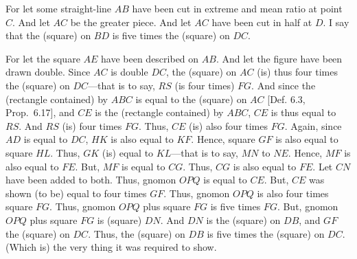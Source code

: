 \begin{Parallel}{}{}
{\epsfysize=2.5in
\centerline{}

For let some straight-line $AB$ have been cut in extreme and mean ratio
at point $C$. And let $AC$ be the greater piece. And let $AC$ have been
cut in half at $D$. I say that the (square) on $BD$ is five times the
(square) on $DC$. 

For let the square $AE$ have been described on $AB$. And let the
figure have been drawn double. Since $AC$ is double $DC$, the
(square) on $AC$ (is) thus four times the (square) on $DC$---that
is to say, $RS$ (is four times) $FG$. And since the (rectangle contained)
by $ABC$ is equal to the (square) on $AC$ [Def. 6.3, Prop.~6.17],
and $CE$ is the (rectangle contained) by $ABC$,  $CE$ is thus equal
to $RS$. And $RS$ (is) four times $FG$. Thus, $CE$ (is) also four times
$FG$. Again, since $AD$ is equal to $DC$, $HK$ is also equal to
$KF$. Hence, square $GF$ is also equal to square $HL$. Thus,
$GK$ (is) equal to $KL$---that is to say, $MN$ to $NE$. 
Hence, $MF$ is also equal to $FE$. But, $MF$ is equal to $CG$.
Thus, $CG$ is also equal to $FE$. Let $CN$ have been added to both.
Thus, gnomon $OPQ$ is equal to $CE$. But, $CE$ was shown (to be)
equal to four times $GF$. Thus, gnomon $OPQ$  is also four times
square $FG$. Thus, gnomon $OPQ$ plus square $FG$ is five times
$FG$. But, gnomon $OPQ$ plus square $FG$ is (square) $DN$. 
And  $DN$ is the (square) on $DB$, and $GF$ the (square)
on $DC$. Thus, the (square) on $DB$ is five times the (square)
on $DC$. (Which is) the very thing it was required to show.}
\end{Parallel}

